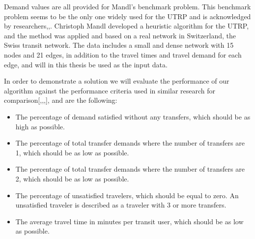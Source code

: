 
Demand values are all provided for Mandl's benchmark problem\citep{mandl79}. This benchmark problem seems to be the only one widely used for the UTRP and is acknowledged by researchers\citep{fan09},\citep{kechagiopoulos14},\citep{nikolic14}. Christoph Mandl\citep{mandl79} developed a heuristic algorithm for the UTRP, and the method was applied and based on a real network in Switzerland, the Swiss transit network\citep{mandl80}. The data includes a small and dense network with 15 nodes and 21 edges, in addition to the travel times and travel demand for each edge, and will in this thesis be used as the input data. %



In order to demonstrate a solution\citep{cohen88} we will evaluate the performance of our algorithm against the performance criteria used in similar research for comparison[\citep{kechagiopoulos14},\citep{mandl80},\citep{nikolic14},\citep{fan09}], and are the following:
\begin{itemize}
\item The percentage of demand satisfied without any transfers, which should be as high as possible.
\item The percentage of total transfer demands where the number of transfers are 1, which should be as low as possible.
\item The percentage of total transfer demands where the number of transfers are 2, which should be as low as possible.
\item The percentage of unsatisfied travelers, which should be equal to zero. An unsatisfied traveler is described as a traveler with 3 or more transfers.
\item The average travel time in minutes per transit user, which should be as low as possible. %
\end{itemize}

